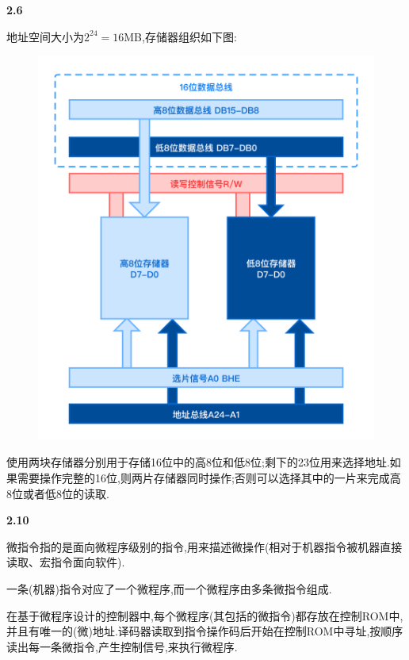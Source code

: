 \documentclass{article}
\begin{document}
    \noindent\textbf{2.6}\par
    地址空间大小为$2^{24}=16$MB,存储器组织如下图:\\
    \begin{figure}[h]
        \centering
        \includegraphics[scale=0.3]{hw2.png}
        \end{figure}
    \par
    使用两块存储器分别用于存储16位中的高8位和低8位;剩下的23位用来选择地址.如果需要操作完整的16位,则两片存储器同时操作;否则可以选择其中的一片来完成高8位或者低8位的读取.
    \\[4pt]\par

    \noindent\textbf{2.10}\par
    微指令指的是面向微程序级别的指令,用来描述微操作(相对于机器指令被机器直接读取、宏指令面向软件).\par
    一条(机器)指令对应了一个微程序,而一个微程序由多条微指令组成.\par
    在基于微程序设计的控制器中,每个微程序(其包括的微指令)都存放在控制ROM中,并且有唯一的(微)地址.译码器读取到指令操作码后开始在控制ROM中寻址,按顺序读出每一条微指令,产生控制信号,来执行微程序.
    \\[4pt]\par
\end{document}
